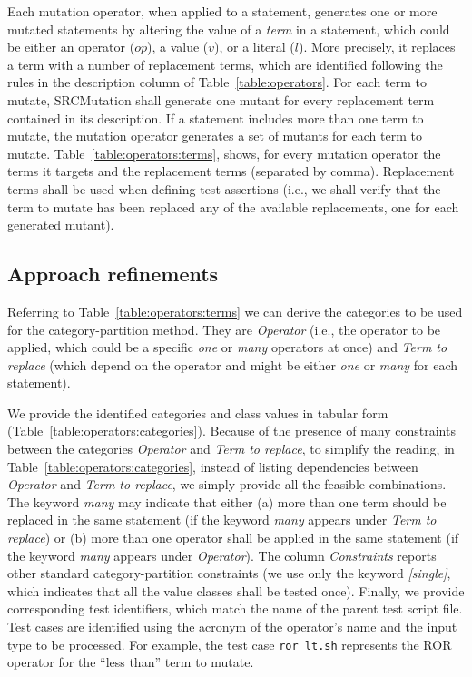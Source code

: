 Each mutation operator, when applied to a statement, generates one or more mutated statements by altering the value of a \emph{term} in a statement, which could be either an operator  ($op$), a value ($v$), or a literal ($l$). More precisely, it replaces a term with a number of replacement terms, which are identified following the rules in the description column of Table~\ref{table:operators}.
For each term to mutate, SRCMutation shall generate one mutant for every replacement term contained in its description.
If a statement includes more than one term to mutate, the mutation operator generates a set of mutants for each term to mutate. Table~\ref{table:operators:terms}, shows, for every mutation operator the terms it targets and the replacement terms (separated by comma). Replacement terms shall be used when defining test assertions (i.e., we shall verify that the term to mutate has been replaced any of the available replacements, one for each generated mutant).




\clearpage

\subsection{Approach refinements}

Referring to Table~\ref{table:operators:terms} we can derive the categories to be used for the category-partition method.
They are \emph{Operator} (i.e., the operator to be applied, which could be a specific \emph{one} or \emph{many} operators at once) and \emph{Term to replace} (which depend on the operator and might be either \emph{one} or \emph{many} for each statement).

We provide the identified categories and class values in tabular form (Table~\ref{table:operators:categories}).
Because of the presence of many constraints between the categories \emph{Operator} and \emph{Term to replace},
to simplify the reading, in Table~\ref{table:operators:categories}, instead of listing dependencies between \emph{Operator} and \emph{Term to replace}, we simply provide all the feasible combinations.
The keyword \emph{many} may indicate that either (a) more than one term should be replaced in the same statement (if the keyword \emph{many} appears under \emph{Term to replace}) or (b) more than one operator shall be applied in the same statement (if the keyword \emph{many} appears under \emph{Operator}).
The column \emph{Constraints} reports other standard category-partition constraints (we use only the keyword \emph{[single]}, which indicates that all the value classes shall be tested once).
Finally, we provide corresponding test identifiers, which match the name of the parent test script file. Test cases are identified using the acronym of the operator's name and the input type to be processed. For example, the test case \texttt{ror\_lt.sh} represents the ROR operator for the ``less than'' term to mutate.


